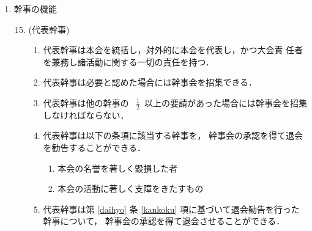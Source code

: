 \begin{enumerate}
\item	幹事の機能\\
%
\begin{enumerate}
\setcounter{enumii}{14}
\item	\label{daihyo}(代表幹事)
\begin{enumerate}
	\item	代表幹事は本会を統括し，対外的に本会を代表し，かつ大会責
任者を兼務し諸活動に関する一切の責任を持つ．\\
	\item	代表幹事は必要と認めた場合には幹事会を招集できる．\\
	\item	代表幹事は他の幹事の~
\(\displaystyle{\frac{1}{2}}\)~以上の要請があった場合には幹事会を招集しなければならない．\\

	\item	\label{kankoku}代表幹事は以下の条項に該当する幹事を，
幹事会の承認を得て退会を勧告することができる．\\
		\begin{enumerate}
			\item	本会の名誉を著しく毀損した者\\
			\item	本会の活動に著しく支障をきたすもの\\
		\end{enumerate}
	\item	代表幹事は第 \ref{daihyo} 条 \ref{kankoku} 項に基づいて退会勧告を行った幹事について，
幹事会の承認を得て退会させることができる．\\


\end{enumerate}
\end{enumerate}
\end{enumerate}
